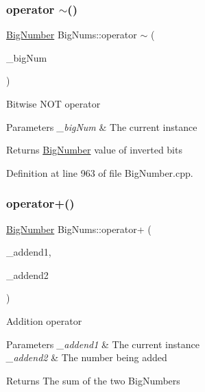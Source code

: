 \subsubsection{\texorpdfstring{operator $\sim$()}{operator ~()}}
{\footnotesize\ttfamily \mbox{\hyperlink{class_big_nums_1_1_big_number}{Big\+Number}} Big\+Nums\+::operator $\sim$ (\begin{DoxyParamCaption}\item[{const \mbox{\hyperlink{class_big_nums_1_1_big_number}{Big\+Number}} \&}]{\+\_\+big\+Num }\end{DoxyParamCaption})}

Bitwise N\+OT operator 
\begin{DoxyParams}{Parameters}
{\em \+\_\+big\+Num} & The current instance \\
\hline
\end{DoxyParams}
\begin{DoxyReturn}{Returns}
\mbox{\hyperlink{class_big_nums_1_1_big_number}{Big\+Number}} value of inverted bits 
\end{DoxyReturn}


Definition at line 963 of file Big\+Number.\+cpp.

\mbox{\label{namespace_big_nums_a43db6cb13170c6129a77c057ef76017e}} 
\subsubsection{\texorpdfstring{operator+()}{operator+()}}
{\footnotesize\ttfamily \mbox{\hyperlink{class_big_nums_1_1_big_number}{Big\+Number}} Big\+Nums\+::operator+ (\begin{DoxyParamCaption}\item[{\mbox{\hyperlink{class_big_nums_1_1_big_number}{Big\+Number}}}]{\+\_\+addend1,  }\item[{const \mbox{\hyperlink{class_big_nums_1_1_big_number}{Big\+Number}} \&}]{\+\_\+addend2 }\end{DoxyParamCaption})}

Addition operator 
\begin{DoxyParams}{Parameters}
{\em \+\_\+addend1} & The current instance \\
\hline
{\em \+\_\+addend2} & The number being added \\
\hline
\end{DoxyParams}
\begin{DoxyReturn}{Returns}
The sum of the two Big\+Numbers 
\end{DoxyReturn}


